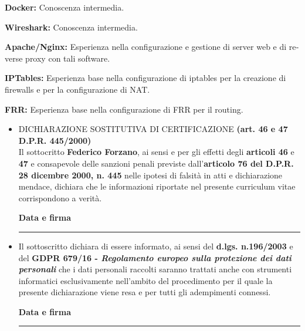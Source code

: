 \documentclass[
    italian,
    a4paper,
    nologo,
    notitle
]{europasscv}
\newcommand{\englishText}[1]{\foreignlanguage{english}{#1}}
\begin{document}
\begin{europasscv}
{\begin{ecvitemize}
            \item \textbf{Docker:} Conoscenza intermedia.
            \item \textbf{Wireshark:} Conoscenza intermedia.
            \item \textbf{Apache/Nginx:} Esperienza nella configurazione e
            gestione di server web e di \englishText{reverse proxy} con tali
            software.
            \item \textbf{IPTables:} Esperienza base nella configurazione di
            iptables per la creazione di firewalls e per la configurazione di
            NAT.
            \item \textbf{FRR:} Esperienza base nella configurazione di FRR per
            il routing.
        \end{ecvitemize}
    }

    \ecvlanguageheader
    \ecvlanguagefooter
\end{europasscv}
\vspace{1cm}
\newpage
\textcolor{ecvtextcolor}{
    \begin{itemize}
        \selectfont
        \item DICHIARAZIONE SOSTITUTIVA DI CERTIFICAZIONE \textbf{(art. 46 e 47 D.P.R. 445/2000)}\\
              Il sottocritto \textbf{Federico Forzano}, ai sensi e per gli effetti degli \textbf{articoli 46} e \textbf{47} e
              consapevole delle sanzioni penali previste dall'\textbf{articolo 76 del D.P.R. 28 dicembre 2000, n. 445} nelle ipotesi di
              falsità in atti e dichiarazione mendace, dichiara che le informazioni riportate nel presente curriculum vitae
              corrispondono a verità.
              \begin{flushright}
                  \textbf{Data e firma}\vspace{0.5cm}\\
                  \rule{0.3\textwidth}{0.4pt}
              \end{flushright}
        \item Il sottoscritto dichiara di essere informato, ai sensi del \textbf{d.lgs. n.196/2003} e
              del \textbf{GDPR 679/16 - \emph{Regolamento europeo sulla protezione dei dati personali}} che i dati personali raccolti saranno trattati anche
              con strumenti informatici esclusivamente nell'ambito del procedimento per il
              quale la presente dichiarazione viene resa e per tutti gli adempimenti connessi.
              \begin{flushright}
                  \textbf{Data e firma}\vspace{0.5cm}\\
                  \rule{0.3\textwidth}{0.4pt}
              \end{flushright}
    \end{itemize}
}
\end{document}
